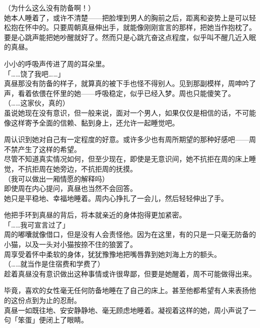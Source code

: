 （为什么这么没有防备啊！）\\

她本人睡着了，或许不清楚——把脸埋到男人的胸前之后，距离和姿势上是可以轻松抱在怀中的。只要周朝真昼伸出手，就能像刚刚宣言的那样，把她当作抱枕了。\\

要是心跳声能把她吵醒就好了。然而只是心跳亢奋这点程度，似乎叫不醒几近入眠的真昼。

小小的呼吸声传进了周的耳朵里。\\

「……饶了我吧……」\\

真昼那没有防备的样子，就算真的被下手也怪不得别人。见到那副模样，周呻吟了声，看着依偎在怀里的她——呼吸稳定，似乎已经入梦。周也只能傻笑了。\\

（……这家伙，真的）\\

虽说她现在没有意识，但一般来说，面对一个男人，如果仅仅是相信的话，不可能像这样寄予全面的信赖、黏到身上，还允许一起睡觉吧。

周认识到她对自己有一定程度的好意。或许多少也有周所期望的那种好感吧——周不禁产生了这样的希望。\\

尽管不知道真实情况如何，但至少现在，即使是无意识间，她不抗拒在周的床上睡觉，不抗拒周在她旁边，不抗拒周的抚摸。\\

（我可以做出一厢情愿的解释吗）\\

即使周在内心提问，真昼也当然不会回答。\\

她只是平稳地、幸福地睡着。周内心挣扎了一会儿，然后轻轻伸出了手。

他把手环到真昼的背后，将本就亲近的身体抱得更加紧密。\\

「……我可宣言过了」\\

周的嘟囔就像借口，但是没有人会责怪他。因为在这里，有的只是一只毫无防备的小猫，以及一头对小猫按捺不住的狼罢了。\\

周享受着怀中柔软的身体，犹犹豫豫地把嘴唇靠到她刘海上方的额头。\\

（……就当作是住宿费和学费了）\\

趁着真昼没有意识做出这种事情或许很卑鄙，但要是她醒着，周不可能做得出来。

毕竟，喜欢的女性毫无任何防备地睡在了自己的床上。甚至他都希望有人来表扬他的这份点到为止的忍耐。\\

真昼一如既往地、安安静静地、毫无顾虑地睡着。凝视着这样的她，周小声说了一句「笨蛋」便闭上了眼睛。
